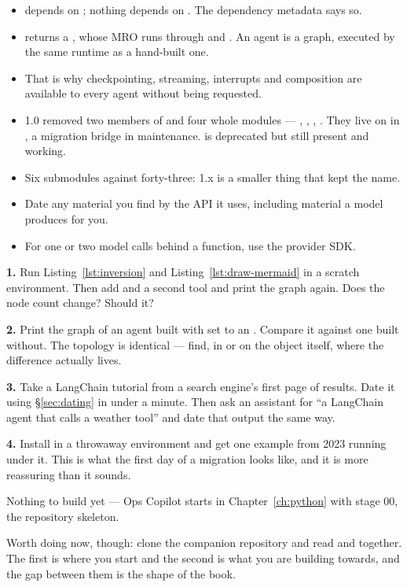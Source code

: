 \begin{itemize}[leftmargin=1.4em]
\item {} depends on ; nothing depends on
      . The dependency metadata says so.
\item {} returns a , whose MRO runs
      through  and . An agent is a graph, executed by
      the same runtime as a hand-built one.
\item That is why checkpointing, streaming, interrupts and composition are
      available to every agent without being requested.
\item 1.0 removed two members of  and four whole
      modules --- , , ,
      . They live on in , a migration
      bridge in maintenance.  is deprecated but
      still present and working.
\item Six submodules against forty-three: 1.x is a smaller thing that kept the
      name.
\item Date any material you find by the API it uses, including material a model
      produces for you.
\item For one or two model calls behind a function, use the provider SDK.
\end{itemize}

\begin{exercisebox}
\textbf{1.} Run Listing~\ref{lst:inversion} and Listing~\ref{lst:draw-mermaid} in
a scratch environment. Then add  and a second tool and print
the graph again. Does the node count change? Should it?

\textbf{2.} Print the graph of an agent built with  set to an
. Compare it against one built without. The topology is
identical --- find, in  or on the object itself, where
the difference actually lives.

\textbf{3.} Take a LangChain tutorial from a search engine's first page of
results. Date it using \S\ref{sec:dating} in under a minute. Then ask an
assistant for ``a LangChain agent that calls a weather tool'' and date that
output the same way.

\textbf{4.} Install  in a throwaway environment and get
one  example from 2023 running under it. This is what the first day
of a migration looks like, and it is more reassuring than it sounds.
\end{exercisebox}

\begin{projectbox}
Nothing to build yet --- Ops Copilot starts in Chapter~\ref{ch:python} with stage
00, the repository skeleton.

Worth doing now, though: clone the companion repository and read
 and  together.
The first is where you start and the second is what you are building towards, and
the gap between them is the shape of the book.
\end{projectbox}
